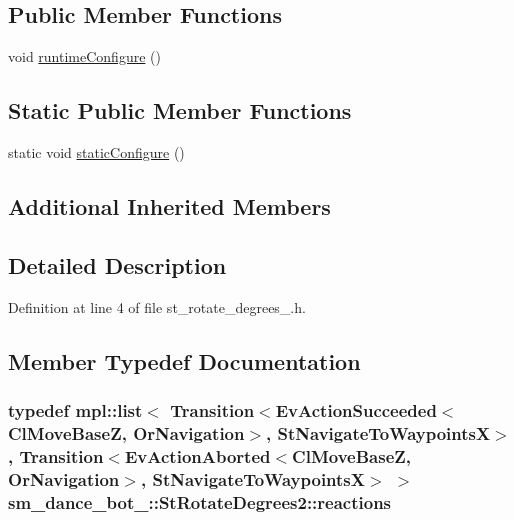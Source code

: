\subsection*{Public Member Functions}
\begin{DoxyCompactItemize}
\item 
void \hyperlink{structsm__dance__bot__3_1_1StRotateDegrees2_a313887075af8916f0bbbabedac88dff2}{runtime\+Configure} ()
\end{DoxyCompactItemize}
\subsection*{Static Public Member Functions}
\begin{DoxyCompactItemize}
\item 
static void \hyperlink{structsm__dance__bot__3_1_1StRotateDegrees2_a69e575c52ebf29a922eef43dbcda2ccf}{static\+Configure} ()
\end{DoxyCompactItemize}
\subsection*{Additional Inherited Members}


\subsection{Detailed Description}


Definition at line 4 of file st\+\_\+rotate\+\_\+degrees\+\_.\+h.



\subsection{Member Typedef Documentation}
\subsubsection[{\texorpdfstring{reactions}{reactions}}]{\setlength{\rightskip}{0pt plus 5cm}typedef mpl\+::list$<$ Transition$<$Ev\+Action\+Succeeded$<${\bf Cl\+Move\+BaseZ}, {\bf Or\+Navigation}$>$, {\bf St\+Navigate\+To\+WaypointsX}$>$, Transition$<$Ev\+Action\+Aborted$<${\bf Cl\+Move\+BaseZ}, {\bf Or\+Navigation}$>$, {\bf St\+Navigate\+To\+WaypointsX}$>$ $>$ {\bf sm\+\_\+dance\+\_\+bot\+\_\+::\+St\+Rotate\+Degrees2\+::reactions}}\hypertarget{structsm__dance__bot__3_1_1StRotateDegrees2_ab4f9ea0f49f9b8dc2a88822d64a1ac87}{}\label{structsm__dance__bot__3_1_1StRotateDegrees2_ab4f9ea0f49f9b8dc2a88822d64a1ac87}


